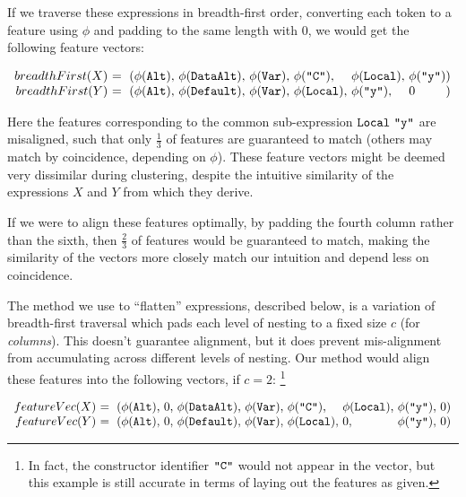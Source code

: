 If we traverse these expressions in breadth-first order, converting each token to a feature using $\phi$ and padding to the same length with $0$, we would get the following feature vectors:

\begin{small}
  \begin{equation}
    \begin{array}{r@{}l@{}l@{}l@{}l@{}l@{}l@{}l}
      breadthFirst(X)\ &=\ (\feature{\CAlt},\ &\feature{\CDataAlt},\ &\feature{\CVar},\ &\feature{\id{C}},\ &\feature{\CLocal},\ &\feature{\id{y}} &) \\
      breadthFirst(Y)\ &=\ (\feature{\CAlt},\ &\feature{\CDefault},\ &\feature{\CVar},\ &\feature{\CLocal},\ &\feature{\id{y}},\ &0 &)
    \end{array}
  \end{equation}
\end{small}

Here the features corresponding to the common sub-expression $\texttt{Local}\ \texttt{"y"}$ are misaligned, such that only $\frac{1}{3}$ of features are guaranteed to match (others may match by coincidence, depending on $\phi$). These feature vectors might be deemed very dissimilar during clustering, despite the intuitive similarity of the expressions $X$ and $Y$ from which they derive.

If we were to align these features optimally, by padding the fourth column rather than the sixth, then $\frac{2}{3}$ of features would be guaranteed to match, making the similarity of the vectors more closely match our intuition and depend less on coincidence.

The method we use to ``flatten'' expressions, described below, is a variation of breadth-first traversal which pads each level of nesting to a fixed size $c$ (for \emph{columns}). This doesn't guarantee alignment, but it does prevent mis-alignment from accumulating across different levels of nesting. Our method would align these features into the following vectors, if $c = 2$: \footnote{In fact, the constructor identifier $\texttt{"C"}$ would not appear in the vector, but this example is still accurate in terms of laying out the features as given.}

\begin{small}
  \begin{equation}\label{eq:flattened}
    \begin{array}{r@{}l@{}l@{}l@{}l@{}l@{}l@{}l@{}l@{}l}
      featureVec(X)\ &=\ (\feature{\CAlt},\ &0,\ &\feature{\CDataAlt},\ &\feature{\CVar},\ &\feature{\id{C}},\  &\feature{\CLocal},\ &\feature{\id{y}},\ &0 &) \\
      featureVec(Y)\ &=\ (\feature{\CAlt},\ &0,\ &\feature{\CDefault},\ &\feature{\CVar},\ &\feature{\CLocal},\ &0,\                 &\feature{\id{y}},\ &0 &)
    \end{array}
  \end{equation}
\end{small}

